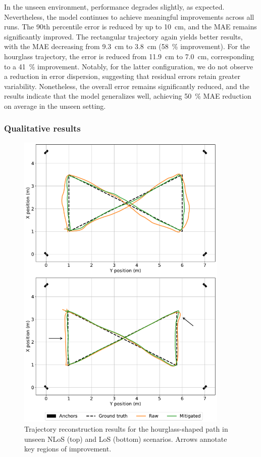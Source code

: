 In the unseen environment, performance degrades slightly, as expected. Nevertheless, the model continues to achieve meaningful improvements across all runs. The 90th percentile error is reduced by up to \SI{10}{\centi\metre}, and the MAE remains significantly improved. The rectangular trajectory again yields better results, with the MAE decreasing from \SI{9.3}{\centi\metre} to \SI{3.8}{\centi\metre} (\SI{58}{\percent} improvement). For the hourglass trajectory, the error is reduced from \SI{11.9}{\centi\metre} to \SI{7.0}{\centi\metre}, corresponding to a \SI{41}{\percent} improvement. Notably, for the latter configuration, we do not observe a reduction in error dispersion, suggesting that residual errors retain greater variability. Nonetheless, the overall error remains significantly reduced, and the results indicate that the model generalizes well, achieving \SI{50}{\percent} MAE reduction on average in the unseen setting.

\subsubsection{Qualitative results}

\begin{figure}[tbh]
    \centering
    \includegraphics[width=0.9\textwidth]{Figures/experiments_and_results/hourglass_trajectory.pdf}
    \caption{Trajectory reconstruction results for the hourglass-shaped path in unseen NLoS (top) and LoS (bottom) scenarios. Arrows annotate key regions of improvement.}
    \label{fig:trajectories_hourglass}
\end{figure}

